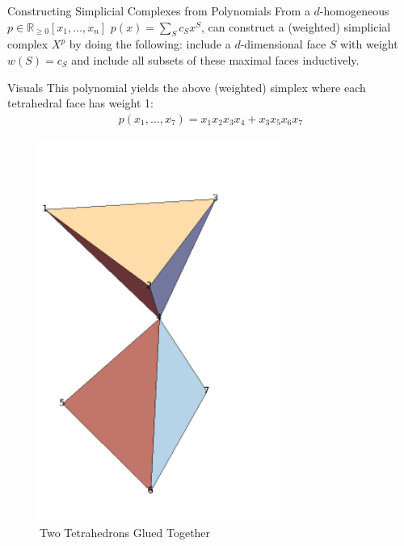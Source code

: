 \documentclass[10pt]{beamer}
\newcommand{\R}{\mathbb{R}}
\begin{document}
\begin{frame}{Constructing Simplicial Complexes from Polynomials}
    From a $d$-homogeneous $p \in \R_{\geq 0}[x_1, \ldots, x_n]$ $p(x) = \sum_S c_Sx^S$, can construct a (weighted) simplicial complex $X^p$ by doing the following: include a $d$-dimensional face $S$ with weight $w(S) = c_S$ and include all subsets of these maximal faces inductively.
\end{frame}


\begin{frame}{Visuals}
    This polynomial yields the above (weighted) simplex where each tetrahedral face has weight 1: \begin{align*}
        p(x_1, \ldots, x_7) = x_1x_2x_3x_4 + x_3x_5x_6x_7
    \end{align*}
    \begin{figure}
        \centering
        \includegraphics[angle=90, width=0.7\textwidth]{imgs/simplex.png}
        \caption{Two Tetrahedrons Glued Together}
        \label{fig:enter-label}
    \end{figure}
\end{frame}
\end{document}
